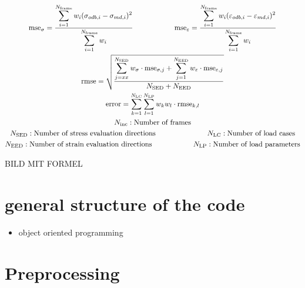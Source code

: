     \begin{center}
        \begin{gather}
            \text{mse}_{\sigma} = \frac{\displaystyle\sum_{i=1}^{N_\text{frame}} w_i (\sigma_{odb,i} - \sigma_{md,i})^2}{\displaystyle\sum_{i=1}^{N_\text{frame}}w_i } 
            \hspace{2cm}
            \text{mse}_{\varepsilon} = \frac{\displaystyle\sum_{i=1}^{N_{\text{frame}}} w_i (\varepsilon_{odb,i} - \varepsilon_{md,i})^2}{\displaystyle\sum_{i=1}^{N_\text{frame}}w_i } \\
            \text{rmse} = \sqrt{\frac{\displaystyle\sum_{j=xx}^{N_\text{SED}} w_{\sigma} \cdot \text{mse}_{\sigma,j} + \displaystyle\sum_{j=1}^{N_\text{EED}} w_{\varepsilon} \cdot \text{mse}_{\varepsilon,j}}{N_\text{SED} + N_\text{EED}}} \\
            \text{error} = \sum_{k=1}^{N_\text{LC}} \sum_{l=1}^{N_\text{LP}} w_k w_l \cdot \text{rmse}_{k,l}  \\
            N_{\text{inc}}: \text{Number of frames} \\
            N_\text{SED}: \text{Number of stress evaluation directions} \hspace{2.5cm}
            N_{\text{LC}}: \text{Number of load cases} \\
            N_\text{EED}: \text{Number of strain evaluation directions}
            \hspace{2cm} N_{\text{LP}}: \text{Number of load parameters}
        \end{gather}
    \end{center}
    
    BILD MIT FORMEL 
    
    

    

    \section{general structure of the code}

    \begin{itemize}
        \item object oriented programming
    \end{itemize}
    
    \section{Preprocessing}

